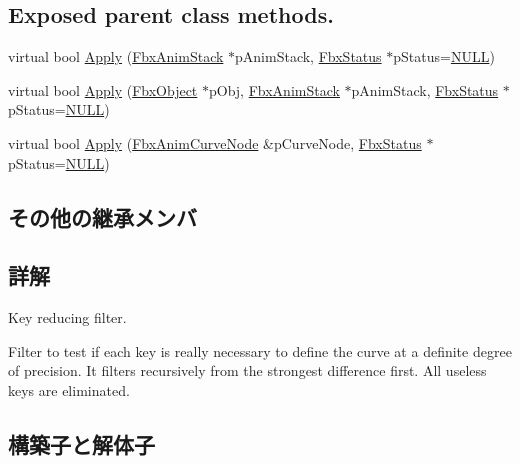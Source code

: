 \subsection*{Exposed parent class methods.}
\begin{DoxyCompactItemize}
\item 
virtual bool \hyperlink{class_fbx_anim_curve_filter_key_reducer_ace307ff2d9d99bf845ddaa26649fb136}{Apply} (\hyperlink{class_fbx_anim_stack}{Fbx\+Anim\+Stack} $\ast$p\+Anim\+Stack, \hyperlink{class_fbx_status}{Fbx\+Status} $\ast$p\+Status=\hyperlink{fbxarch_8h_a070d2ce7b6bb7e5c05602aa8c308d0c4}{N\+U\+LL})
\item 
virtual bool \hyperlink{class_fbx_anim_curve_filter_key_reducer_ac9cd8a32e87c1589d0f245be377a3da3}{Apply} (\hyperlink{class_fbx_object}{Fbx\+Object} $\ast$p\+Obj, \hyperlink{class_fbx_anim_stack}{Fbx\+Anim\+Stack} $\ast$p\+Anim\+Stack, \hyperlink{class_fbx_status}{Fbx\+Status} $\ast$p\+Status=\hyperlink{fbxarch_8h_a070d2ce7b6bb7e5c05602aa8c308d0c4}{N\+U\+LL})
\item 
virtual bool \hyperlink{class_fbx_anim_curve_filter_key_reducer_a1f3a0f984cf30eb74d9ae260ef9ae252}{Apply} (\hyperlink{class_fbx_anim_curve_node}{Fbx\+Anim\+Curve\+Node} \&p\+Curve\+Node, \hyperlink{class_fbx_status}{Fbx\+Status} $\ast$p\+Status=\hyperlink{fbxarch_8h_a070d2ce7b6bb7e5c05602aa8c308d0c4}{N\+U\+LL})
\end{DoxyCompactItemize}
\subsection*{その他の継承メンバ}


\subsection{詳解}
Key reducing filter.

Filter to test if each key is really necessary to define the curve at a definite degree of precision. It filters recursively from the strongest difference first. All useless keys are eliminated. 

\subsection{構築子と解体子}
\mbox{\label{class_fbx_anim_curve_filter_key_reducer_ad43e77bed0728ae7cd9f24e33753f984}} 
